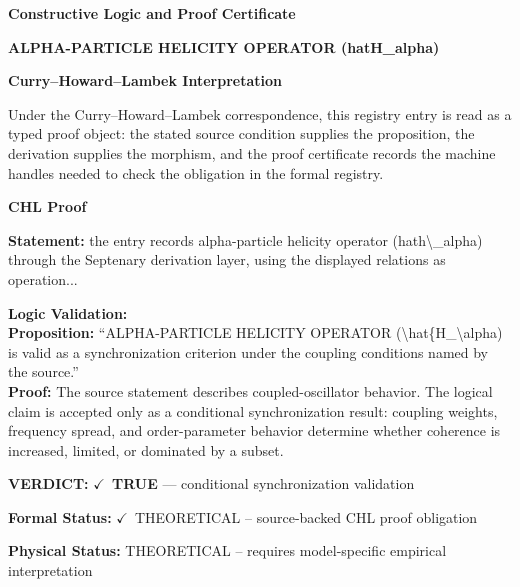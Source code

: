 \clearpage
\begingroup\tzpsupportsetup
\noindent\textbf{\fontsize{10.8pt}{12.8pt}\selectfont [ID 0645] Constructive Logic and Proof Certificate}\par
\noindent\textbf{\fontsize{10pt}{12pt}\selectfont ALPHA-PARTICLE HELICITY OPERATOR (hatH\_alpha)}\par
\vspace{0.45em}
\begingroup
\footnotesize
\setlength{\parskip}{0.22em}
\setlength{\parindent}{0pt}
\noindent\textbf{Curry--Howard--Lambek Interpretation}\par
Under the Curry--Howard--Lambek correspondence, this registry entry is read as a typed proof
object: the stated source condition supplies the proposition, the derivation supplies the
morphism, and the proof certificate records the machine handles needed to check the obligation
in the formal registry.

\vspace{0.45em}
\noindent\textbf{CHL Proof}\par
\textbf{Statement:} the entry records alpha-particle helicity operator (hath\textbackslash{}\_alpha) through the Septenary
derivation layer, using the displayed relations as operation...

\textbf{Logic Validation:}\\
\textbf{Proposition:} ``ALPHA-PARTICLE HELICITY OPERATOR (\textbackslash{}hat\{H\_\textbackslash{}alpha) is valid as a synchronization
criterion under the coupling conditions named by the source.''\\
\textbf{Proof:} The source statement describes coupled-oscillator behavior. The logical claim is
accepted only as a conditional synchronization result: coupling weights, frequency
spread, and order-parameter behavior determine whether coherence is increased, limited,
or dominated by a subset.

\textbf{VERDICT:} \ensuremath{\checkmark}\ \textbf{TRUE} --- conditional synchronization validation

\textbf{Formal Status:} \ensuremath{\checkmark}\ THEORETICAL -- source-backed CHL proof obligation

\textbf{Physical Status:} THEORETICAL -- requires model-specific empirical interpretation
\par\vspace{0.45em}
\par
\ifTZPDarkEdition
{}
\fi
\endgroup
\endgroup
